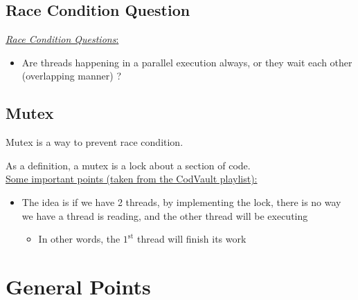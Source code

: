 \documentclass[12pt,a4paper]{book}
\begin{document}
\subsection{Race Condition Question}

 \underline{\textit{Race Condition Questions}:} 

\begin{itemize}

\item Are threads happening in a parallel execution always, or they wait each other (overlapping manner) ?

\end{itemize}


\subsection{Mutex}

Mutex is a way to prevent race condition.

As a definition, a mutex is a lock about a section of code. \\

\underline{Some important points (taken from the CodVault playlist):}

\begin{itemize}

\item The idea is if we have 2 threads, by implementing the lock, there is no way we have a thread is reading, and the other thread will be executing

	\begin{itemize}
	\item In other words, the $\mathrm{1}^\mathrm{st}$ thread will finish its work
	\end{itemize}

\end{itemize}



\section{General Points}
\end{document}
